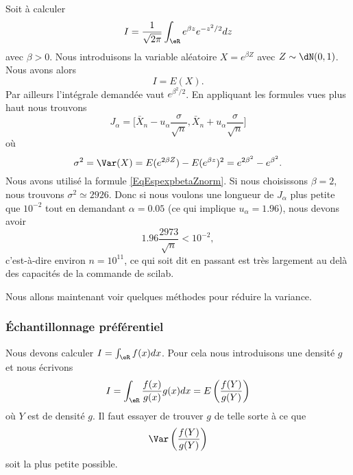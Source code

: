 \begin{example}
	Soit à calculer
	\begin{equation}
		I=\frac{1}{ \sqrt{2\pi} }\int_{\eR} e^{\beta z} e^{-z^2/2}dz
	\end{equation}
	avec \( \beta>0\). Nous introduisons la variable aléatoire \( X= e^{\beta Z}\) avec \( Z\sim\dN(0,1)\). Nous avons alors
	\begin{equation}
		I=E(X).
	\end{equation}
	Par ailleurs l'intégrale demandée vaut \(  e^{\beta^2/2}\). En appliquant les formules vues plus haut nous trouvons
	\begin{equation}
		J_{\alpha}=\big[ \bar X_n-u_{\alpha}\frac{ \sigma }{ \sqrt{n} },\bar X_n+u_{\alpha}\frac{ \sigma }{ \sqrt{n} } \big]
	\end{equation}
	où
	\begin{equation}
		\sigma^2=\Var(X)=E( e^{2\beta Z})-E( e^{\beta z})^2= e^{2\beta^2}- e^{\beta^2}.
	\end{equation}
	Nous avons utilisé la formule \eqref{EqEspexpbetaZnorm}. Si nous choisissons \( \beta=2\), nous trouvons \( \sigma^2\simeq 2926\). Donc si nous voulons une longueur de \( J_{\alpha}\) plus petite que \( 10^{-2}\) tout en demandant \( \alpha=0.05\) (ce qui implique \( u_{\alpha}=1.96\)), nous devons avoir
	\begin{equation}
		1.96\frac{ 2973 }{ \sqrt{n} }<10^{-2},
	\end{equation}
	c'est-à-dire environ \( n=10^{11}\), ce qui soit dit en passant est très largement au delà des capacités de la commande de scilab\cite{BIBooMXHQooDAXmCz}.
\end{example}

Nous allons maintenant voir quelques méthodes pour réduire la variance.

\subsubsection{Échantillonnage préférentiel}

Nous devons calculer \( I=\int_{\eR}f(x)dx\). Pour cela nous introduisons une densité \( g\) et nous écrivons
\begin{equation}
	I=\int_{\eR}\frac{ f(x) }{ g(x) }g(x)dx=E\left( \frac{ f(Y) }{ g(Y) } \right)
\end{equation}
où \( Y\) est de densité \( g\). Il faut essayer de trouver \( g\) de telle sorte à ce que
\begin{equation}
	\Var\left( \frac{ f(Y) }{ g(Y) } \right)
\end{equation}
soit la plus petite possible.

